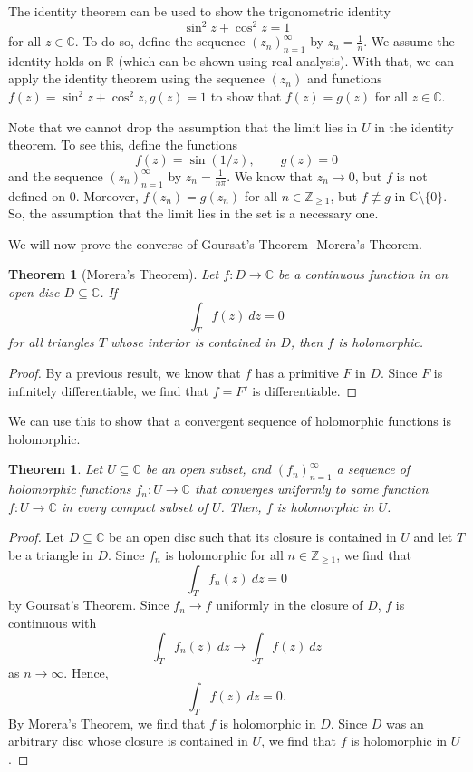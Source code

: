 \documentclass[a4paper, openany]{memoir}
\theoremstyle{definition}
\theoremstyle{plain}
\newtheorem{theorem}[definition]{Theorem}
\begin{document}
    The identity theorem can be used to show the trigonometric identity
    \[\sin^2 z + \cos^2 z = 1\]
    for all $z \in \mathbb{C}$. To do so, define the sequence $(z_n)_{n=1}^\infty$ by $z_n = \frac{1}{n}$. We assume the identity holds on $\mathbb{R}$ (which can be shown using real analysis). With that, we can apply the identity theorem using the sequence $(z_n)$ and functions $f(z) = \sin^2 z + \cos^2 z, g(z) = 1$ to show that $f(z) = g(z)$ for all $z \in \mathbb{C}$.

    Note that we cannot drop the assumption that the limit lies in $U$ in the identity theorem. To see this, define the functions
    \[f(z) = \sin (1/z), \qquad g(z) = 0\]
    and the sequence $(z_n)_{n=1}^\infty$ by $z_n = \frac{1}{n \pi}$. We know that $z_n \to 0$, but $f$ is not defined on $0$. Moreover, $f(z_n) = g(z_n)$ for all $n \in \mathbb{Z}_{\geq 1}$, but $f \not\equiv g$ in $\mathbb{C} \setminus \{0\}$. So, the assumption that the limit lies in the set is a necessary one.

    We will now prove the converse of Goursat's Theorem- Morera's Theorem.
    \begin{theorem}[Morera's Theorem]
        Let $f \colon D \to \mathbb{C}$ be a continuous function in an open disc $D \subseteq \mathbb{C}$. If 
        \[\int_T f(z) \ dz = 0\]
        for all triangles $T$ whose interior is contained in $D$, then $f$ is holomorphic.
    \end{theorem}
    \begin{proof}
        By a previous result, we know that $f$ has a primitive $F$ in $D$. Since $F$ is infinitely differentiable, we find that $f = F'$ is differentiable.
    \end{proof}
    We can use this to show that a convergent sequence of holomorphic functions is holomorphic.
    \begin{theorem}
        Let $U \subseteq \mathbb{C}$ be an open subset, and $(f_n)_{n=1}^\infty$ a sequence of holomorphic functions $f_n \colon U \to \mathbb{C}$ that converges uniformly to some function $f \colon U \to \mathbb{C}$ in every compact subset of $U$. Then, $f$ is holomorphic in $U$.
    \end{theorem}
    \begin{proof}
        Let $D \subseteq \mathbb{C}$ be an open disc such that its closure is contained in $U$ and let $T$ be a triangle in $D$. Since $f_n$ is holomorphic for all $n \in \mathbb{Z}_{\geq 1}$, we find that 
        \[\int_T f_n(z) \ dz = 0\]
        by Goursat's Theorem. Since $f_n \to f$ uniformly in the closure of $D$, $f$ is continuous with
        \[\int_T f_n(z) \ dz \to \int_T f(z) \ dz\]
        as $n \to \infty$. Hence,
        \[\int_T f(z) \ dz = 0.\]
        By Morera's Theorem, we find that $f$ is holomorphic in $D$. Since $D$ was an arbitrary disc whose closure is contained in $U$, we find that $f$ is holomorphic in $U$.
    \end{proof}
    \newpage
\end{document}
